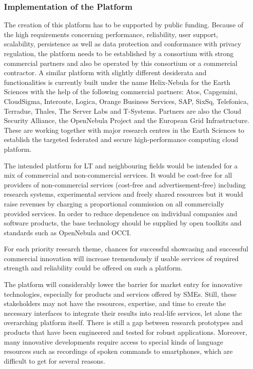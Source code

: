 \documentclass[10pt, plain]{../../metanetpaper}
\begin{document}
\begin{multicols}{2}
 
\subsubsection*{Implementation of the Platform}
\label{sec:implementation-of-platform}

The creation of this platform has to be supported by public funding. Because of the high requirements concerning performance, reliability, user support, scalability, persistence as well as data protection and conformance with privacy regulation, the platform needs to be established by a consortium with strong commercial partners and also be operated by this consortium or a commercial contractor. A similar platform with slightly different desiderata and functionalities is currently built under the name Helix-Nebula for the Earth Sciences with the help of the following commercial partners: Atos, Capgemini, CloudSigma, Interoute, Logica, Orange Business Services, SAP, SixSq, Telefonica, Terradue, Thales, The Server Labs and T-Systems. Partners are also the Cloud Security Alliance, the OpenNebula Project and the European Grid Infrastructure. These are working together with major research centres in the Earth Sciences to establish the targeted federated and secure high-performance computing cloud platform.
 
The intended platform for LT and neighbouring fields would be intended for a mix of commercial and non-commercial services. It would be cost-free for all providers of non-commercial services (cost-free and advertisement-free) including research systems, experimental services and freely shared resources but it would raise revenues by charging a proportional commission on all commercially provided services. In order to reduce dependence on individual companies and software products, the base technology should be supplied by open toolkits and standards such as OpenNebula and OCCI.  
 
For each priority research theme, chances for successful showcasing and successful commercial innovation will increase tremendously if usable services of required strength and reliability could be offered on such a platform.
 
The platform will considerably lower the barrier for market entry for innovative technologies, especially for products and services offered by SMEs. Still, these stakeholders may not have the resources, expertise, and time to create the necessary interfaces to integrate their results into real-life services, let alone the overarching platform itself. There is still a gap between research prototypes and products that have been engineered and tested for robust applications. Moreover, many innovative developments require access to special kinds of language resources such as recordings of spoken commands to smartphones, which are difficult to get for several reasons.
 

\end{multicols}
\end{document}
